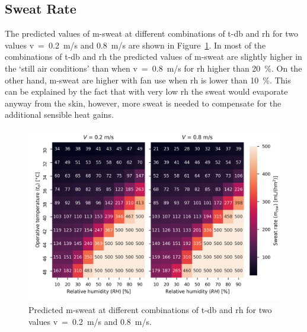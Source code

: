 %

\subsection{Sweat Rate}\label{subsec:sweat-rate}


The predicted values of \ac{m-sweat} at different combinations of \ac{t-db} and \ac{rh} for two values \acf{v}~=~0.2~m/s and 0.8~m/s are shown in Figure~\ref{fig:sweat_rate}.
In most of the combinations of \acf{t-db} and \acf{rh} the predicted values of \ac{m-sweat} are slightly higher in the `still air conditions' than when \ac{v}~=~0.8~m/s for \ac{rh} higher than 20~\%.
On the other hand, \ac{m-sweat} are higher with fan use when \ac{rh} is lower than 10~\%.
This can be explained by the fact that with very low \ac{rh} the sweat would evaporate anyway from the skin, however, more sweat is needed to compensate for the additional sensible heat gains.

\begin{figure}[thb!]
    \centering
    \includegraphics[width=\textwidth]{figures/sweat_rate}
    \caption{Predicted \acf{m-sweat} at different combinations of \acf{t-db} and \acf{rh} for two values \acf{v}~=~0.2~m/s and 0.8~m/s.}
    \label{fig:sweat_rate}
\end{figure}

